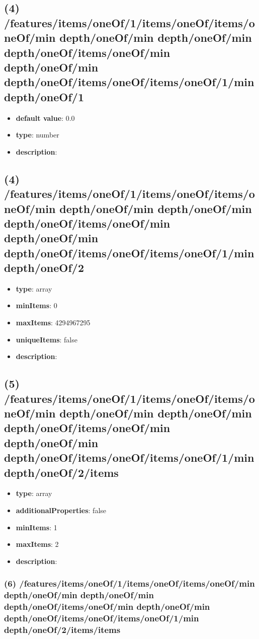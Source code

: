 \subsection{(4) /features/items/oneOf/1/items/oneOf/items/oneOf/min depth/oneOf/min depth/oneOf/min depth/oneOf/items/oneOf/min depth/oneOf/min depth/oneOf/items/oneOf/items/oneOf/1/min depth/oneOf/1}
\begin{itemize}[leftmargin=4em]\item {\bf default value}: 0.0
\item {\bf type}: number
\item {\bf description}: 
\end{itemize}\subsection{(4) /features/items/oneOf/1/items/oneOf/items/oneOf/min depth/oneOf/min depth/oneOf/min depth/oneOf/items/oneOf/min depth/oneOf/min depth/oneOf/items/oneOf/items/oneOf/1/min depth/oneOf/2}
\begin{itemize}[leftmargin=4em]\item {\bf type}: array
\item {\bf minItems}: 0
\item {\bf maxItems}: 4294967295
\item {\bf uniqueItems}: false
\item {\bf description}: 
\end{itemize}\subsection{(5) /features/items/oneOf/1/items/oneOf/items/oneOf/min depth/oneOf/min depth/oneOf/min depth/oneOf/items/oneOf/min depth/oneOf/min depth/oneOf/items/oneOf/items/oneOf/1/min depth/oneOf/2/items}
\begin{itemize}[leftmargin=5em]\item {\bf type}: array
\item {\bf additionalProperties}: false
\item {\bf minItems}: 1
\item {\bf maxItems}: 2
\item {\bf description}: 
\end{itemize}\subsubsection{(6) /features/items/oneOf/1/items/oneOf/items/oneOf/min depth/oneOf/min depth/oneOf/min depth/oneOf/items/oneOf/min depth/oneOf/min depth/oneOf/items/oneOf/items/oneOf/1/min depth/oneOf/2/items/items}
